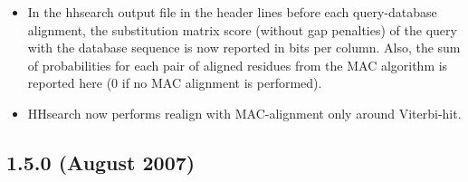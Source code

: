 \documentclass[11pt,a4paper]{article}
\begin{document}
\begin{itemize}
\item{In the hhsearch output file in the header lines before each query-database 
  alignment, the substitution matrix score (without gap penalties) of the query 
  with the database sequence is now reported in bits per column. Also, the sum
  of probabilities for each pair of aligned residues from the MAC algorithm 
  is reported here (0 if no MAC alignment is performed).
}

\item{HHsearch now performs realign with MAC-alignment only around Viterbi-hit.
}

\end{itemize}

\subsection{1.5.0 (August 2007)}
\end{document}
